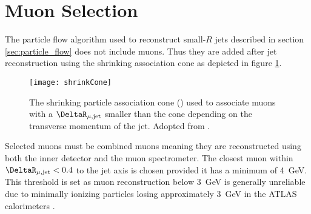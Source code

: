 \section{Muon Selection}
\label{sec:MuonSelection}
The particle flow algorithm used to reconstruct small-$R$ jets described in section \ref{sec:particle_flow} does not include muons. Thus they are added after jet reconstruction using the shrinking association \DeltaR cone as depicted in figure \ref{fig:shrinkCone}.
\begin{figure}[]
  \centering
  \texttt{[image: shrinkCone]}
  \caption{The shrinking particle association cone () used to associate muons with a $\DeltaR_\mathrm{\mu, jet}$ smaller than the cone depending on the transverse momentum of the jet. Adopted from \citep{Jacobs:2697316}. }
  \label{fig:shrinkCone}
\end{figure}
Selected muons must be combined muons meaning they are reconstructed using both the inner detector and the muon spectrometer. The closest muon within $\DeltaR_\mathrm{\mu, jet} < 0.4$ to the jet axis is chosen provided it has a minimum \pt of \qty{4}{GeV}. This threshold is set as muon reconstruction below \qty{3}{GeV} is generally unreliable due to minimally ionizing particles losing approximately \qty{3}{GeV} in the ATLAS calorimeters \citep{expectedPerformanceAtlas}.

